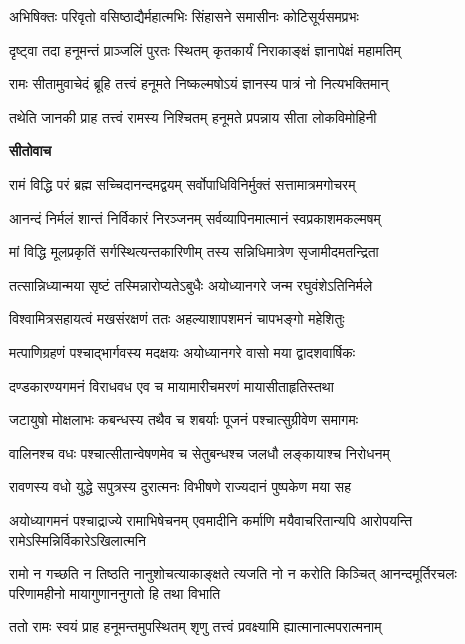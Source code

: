 \twolineshloka
{अभिषिक्तः परिवृतो वसिष्ठाद्यैर्महात्मभिः}
{सिंहासने समासीनः कोटिसूर्यसमप्रभः} %

\twolineshloka
{दृष्ट्वा तदा हनूमन्तं प्राञ्जलिं पुरतः स्थितम्}
{कृतकार्यं निराकाङ्क्षं ज्ञानापेक्षं महामतिम्} %

\twolineshloka
{रामः सीतामुवाचेदं ब्रूहि तत्त्वं हनूमते}
{निष्कल्मषोऽयं ज्ञानस्य पात्रं नो नित्यभक्तिमान्} %

\twolineshloka
{तथेति जानकी प्राह तत्त्वं रामस्य निश्चितम्}
{हनूमते प्रपन्नाय सीता लोकविमोहिनी} %

\textbf{सीतोवाच}

\twolineshloka
{रामं विद्धि परं ब्रह्म सच्चिदानन्दमद्वयम्}
{सर्वोपाधिविनिर्मुक्तं सत्तामात्रमगोचरम्} %

\twolineshloka
{आनन्दं निर्मलं शान्तं निर्विकारं निरञ्जनम्}
{सर्वव्यापिनमात्मानं स्वप्रकाशमकल्मषम्} %

\twolineshloka
{मां विद्धि मूलप्रकृतिं सर्गस्थित्यन्तकारिणीम्}
{तस्य सन्निधिमात्रेण सृजामीदमतन्द्रिता} %

\twolineshloka
{तत्सान्निध्यान्मया सृष्टं तस्मिन्नारोप्यतेऽबुधैः}
{अयोध्यानगरे जन्म रघुवंशेऽतिनिर्मले} %

\twolineshloka
{विश्वामित्रसहायत्वं मखसंरक्षणं ततः}
{अहल्याशापशमनं चापभङ्गो महेशितुः} %

\twolineshloka
{मत्पाणिग्रहणं पश्चाद्भार्गवस्य मदक्षयः}
{अयोध्यानगरे वासो मया द्वादशवार्षिकः} %

\twolineshloka
{दण्डकारण्यगमनं विराधवध एव च}
{मायामारीचमरणं मायासीताहृतिस्तथा} %

\twolineshloka
{जटायुषो मोक्षलाभः कबन्धस्य तथैव च}
{शबर्याः पूजनं पश्चात्सुग्रीवेण समागमः} %

\twolineshloka
{वालिनश्च वधः पश्चात्सीतान्वेषणमेव च}
{सेतुबन्धश्च जलधौ लङ्कायाश्च निरोधनम्} %

\twolineshloka
{रावणस्य वधो युद्धे सपुत्रस्य दुरात्मनः}
{विभीषणे राज्यदानं पुष्पकेण मया सह} %

\threelineshloka
{अयोध्यागमनं पश्चाद्राज्ये रामाभिषेचनम्}
{एवमादीनि कर्माणि मयैवाचरितान्यपि}
{आरोपयन्ति रामेऽस्मिन्निर्विकारेऽखिलात्मनि} %

\fourlineindentedshloka
{रामो न गच्छति न तिष्ठति नानुशोचत्याकाङ्क्षते}
{त्यजति नो न करोति किञ्चित्}
{आनन्दमूर्तिरचलः परिणामहीनो}
{मायागुणाननुगतो हि तथा विभाति} %

\twolineshloka
{ततो रामः स्वयं प्राह हनूमन्तमुपस्थितम्}
{शृणु तत्त्वं प्रवक्ष्यामि ह्यात्मानात्मपरात्मनाम्} %

